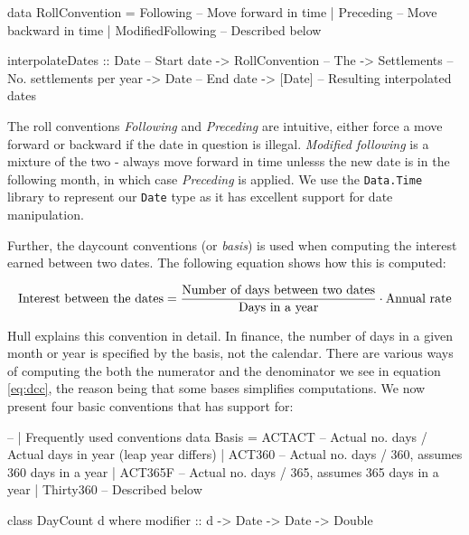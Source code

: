 \begin{hscode}
data RollConvention = Following -- Move forward in time 
                    | Preceding -- Move backward in time
                    | ModifiedFollowing -- Described below

interpolateDates :: Date           -- Start date
                 -> RollConvention -- The 
                 -> Settlements    -- No. settlements per year
                 -> Date           -- End date
                 -> [Date]         -- Resulting interpolated dates
\end{hscode}

The roll conventions \emph{Following} and \emph{Preceding} are intuitive, either
force a move forward or backward if the date in question is illegal. 
\emph{Modified following} is a mixture of the two - always move forward in time
unlesss the new date is in the following month, in which case \emph{Preceding}
is applied.
We use the \texttt{Data.Time} library to represent our \texttt{Date} type
as it has excellent support for date manipulation.\\


Further, the daycount conventions (or \emph{basis}) is used when computing the
interest earned between two dates. The following equation shows how this is
computed:

\begin{equation}\label{eq:dcc}
\text{Interest between the dates} = \\
\frac{\text{Number of days between two dates}}{\text{Days in a year}} \cdot \text{Annual rate}
\end{equation}

Hull\cite{HULL} explains this convention in detail.
In finance, the number of days in a given month or year is specified by the
basis, not the calendar. There are various ways of computing the both the numerator
and the denominator we see in equation \ref{eq:dcc}, the reason being that some
bases simplifies computations. We now present four basic conventions that \hql
has support for:

\begin{hscode}
-- | Frequently used conventions 
data Basis = ACTACT -- Actual no. days / Actual days in year (leap year differs)
           | ACT360    -- Actual no. days / 360, assumes 360 days in a year
           | ACT365F   -- Actual no. days / 365, assumes 365 days in a year
           | Thirty360 -- Described below

class DayCount d where
  modifier :: d -> Date -> Date -> Double
\end{hscode}

